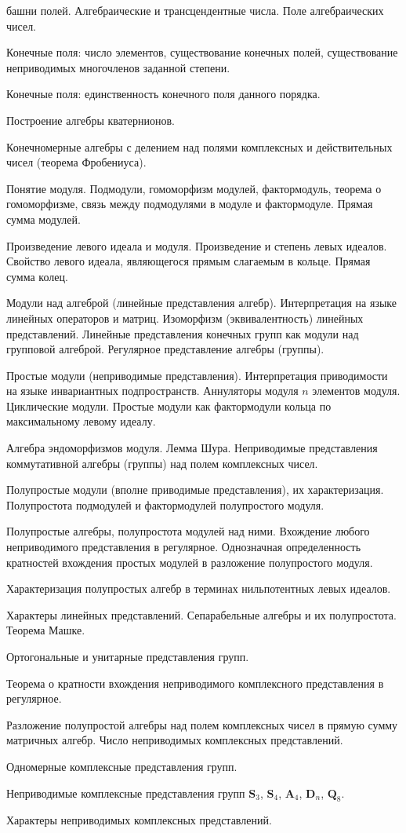 \documentclass[a4paper]{article}
\begin{document}
\begin{nums}{-1}
башни полей. Алгебраические и трансцендентные числа. Поле
алгебраических чисел.
\item
Конечные поля: число элементов, существование конечных полей,
существование неприводимых многочленов заданной степени.
\item
Конечные поля: единственность конечного поля данного порядка.
\item
Построение алгебры кватернионов.
\item
Конечномерные алгебры с делением над полями комплексных и
действительных чисел (теорема Фробениуса).
\item
Понятие модуля. Подмодули, гомоморфизм модулей, фактормодуль,
теорема о гомоморфизме, связь между подмодулями в модуле и
фактормодуле. Прямая сумма модулей.
\item
Произведение левого идеала и модуля. Произведение и степень левых
идеалов. Свойство левого идеала, являющегося прямым слагаемым в
кольце. Прямая сумма колец.
\item
Модули над алгеброй (линейные представления алгебр). Интерпретация
на языке линейных операторов и матриц. Изоморфизм
(эквивалентность) линейных представлений. Линейные представления
конечных групп как модули над групповой алгеброй. Регулярное
представление алгебры (группы).
\item
Простые модули (неприводимые представления). Интерпретация
приводимости на языке инвариантных подпространств. Аннуляторы
модуля $n$ элементов модуля. Циклические модули. Простые модули
как фактормодули кольца по максимальному левому идеалу.
\item
Алгебра эндоморфизмов модуля. Лемма Шура. Неприводимые
представления коммутативной алгебры (группы) над полем комплексных
чисел.
\item
Полупростые модули (вполне приводимые представления), их
характеризация. Полупростота подмодулей и фактормодулей
полупростого модуля.
\item
Полупростые алгебры, полупростота модулей над ними. Вхождение
любого неприводимого представления в регулярное. Однозначная
определенность кратностей вхождения простых модулей в разложение
полупростого модуля.
\item
Характеризация полупростых алгебр в терминах нильпотентных левых
идеалов.
\item
Характеры линейных представлений. Сепарабельные алгебры и их
полупростота. Теорема Машке.
\item
Ортогональные и унитарные представления групп.
\item
Теорема о кратности вхождения неприводимого комплексного
представления в регулярное.
\item
Разложение полупростой алгебры над полем комплексных чисел в
прямую сумму матричных алгебр. Число неприводимых комплексных
представлений.
\item
Одномерные комплексные представления групп.
\item
Неприводимые комплексные представления групп $\mathbf{S}_3$,
$\mathbf{S}_4$, $\mathbf{A}_4$, $\mathbf{D}_n$, $\mathbf{Q}_8$.
\item
Характеры неприводимых комплексных представлений.
\end{nums}
\end{document}
